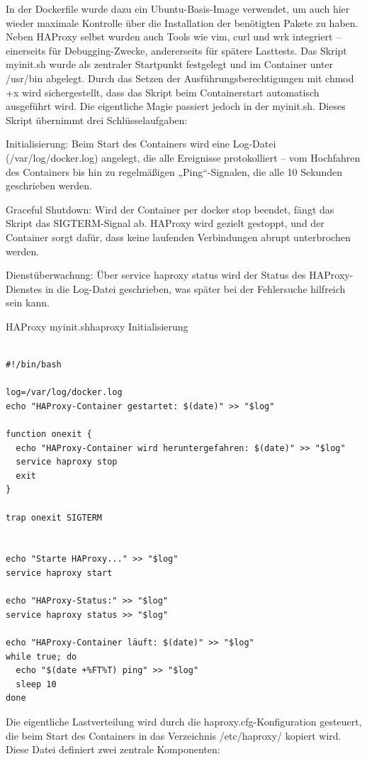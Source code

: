 In der Dockerfile wurde dazu ein Ubuntu-Basis-Image verwendet, um auch hier wieder maximale Kontrolle über die Installation der benötigten Pakete zu haben. Neben HAProxy selbst wurden auch Tools wie vim, curl und wrk integriert – einerseits für Debugging-Zwecke, andererseits für spätere Lasttests. Das Skript myinit.sh wurde als zentraler Startpunkt festgelegt und im Container unter /usr/bin abgelegt. Durch das Setzen der Ausführungsberechtigungen mit chmod +x wird sichergestellt, dass das Skript beim Containerstart automatisch ausgeführt wird. Die eigentliche Magie passiert jedoch in der myinit.sh. Dieses Skript übernimmt drei Schlüsselaufgaben:  

Initialisierung: Beim Start des Containers wird eine Log-Datei (/var/log/docker.log) angelegt, die alle Ereignisse protokolliert – vom Hochfahren des Containers bis hin zu regelmäßigen „Ping“-Signalen, die alle 10 Sekunden geschrieben werden.  

Graceful Shutdown: Wird der Container per docker stop beendet, fängt das Skript das SIGTERM-Signal ab. HAProxy wird gezielt gestoppt, und der Container sorgt dafür, dass keine laufenden Verbindungen abrupt unterbrochen werden.  

Dienstüberwachung: Über service haproxy status wird der Status des HAProxy-Dienstes in die Log-Datei geschrieben, was später bei der Fehlersuche hilfreich sein kann.  

\begin{code}{HAProxy myinit.sh}{haproxy Initialisierung}
        \begin{verbatim}

#!/bin/bash

log=/var/log/docker.log
echo "HAProxy-Container gestartet: $(date)" >> "$log"

function onexit {
  echo "HAProxy-Container wird heruntergefahren: $(date)" >> "$log"
  service haproxy stop
  exit
}

trap onexit SIGTERM


echo "Starte HAProxy..." >> "$log"
service haproxy start

echo "HAProxy-Status:" >> "$log"
service haproxy status >> "$log"

echo "HAProxy-Container läuft: $(date)" >> "$log"
while true; do
  echo "$(date +%FT%T) ping" >> "$log"
  sleep 10
done
  \end{verbatim}
\end{code}

Die eigentliche Lastverteilung wird durch die haproxy.cfg-Konfiguration gesteuert, die beim Start des Containers in das Verzeichnis /etc/haproxy/ kopiert wird. Diese Datei definiert zwei zentrale Komponenten:  

